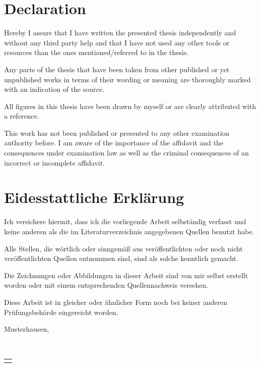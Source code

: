 
\ifdefined\ThesisLanguageIsEnglish
	\chapter*{Declaration}
		\thispagestyle{empty}
		Hereby I assure that I have written the presented thesis independently and without any third party help and that I have not used any other tools or resources than the ones mentioned/referred to in the thesis.
	\medskip

	\noindent
		Any parts of the thesis that have been taken from other published or yet unpublished works in terms of their wording or meaning are thoroughly marked with an indication of the source. 
	\medskip

	\noindent
		All figures in this thesis have been drawn by myself or are clearly attributed with a reference. 
	\medskip

	\noindent
		This work has not been published or presented to any other examination authority before.
		I am aware of the importance of the affidavit and the consequences under examination
		law as well as the criminal consequences of an incorrect or incomplete affidavit.
	\medskip


\else
	\chapter*{Eidesstattliche Erklärung}
		\thispagestyle{empty}
			Ich versichere hiermit, dass ich die vorliegende Arbeit selbständig verfasst und keine anderen als die im Literaturverzeichnis angegebenen Quellen benutzt habe.
		\medskip

		\noindent
			Alle Stellen, die wörtlich oder sinngemäß aus veröffentlichten oder noch nicht veröffentlichten Quellen entnommen sind, sind als solche kenntlich gemacht.
		\medskip

		\noindent
			Die Zeichnungen oder Abbildungen in dieser Arbeit sind von mir selbst erstellt worden oder mit einem entsprechenden Quellennachweis versehen.
		\medskip

		\noindent
			Diese Arbeit ist in gleicher oder ähnlicher Form noch bei keiner anderen Prüfungsbehörde eingereicht worden. 
		\bigskip
\fi

Musterhausen, \ThesisDeliveryDate

\smallskip
\hfill {\raisebox{-2ex}{\ \ }} \\ 
\vspace*{-1.7cm}
\begin{flushright}
	\begin{tabular}{m{5cm}}
		\\ \hline
		\centering \textbf{\myName}\\
	\end{tabular}
\end{flushright}

